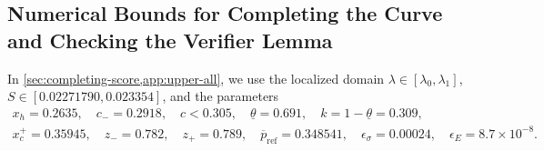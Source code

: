 \documentclass[11pt]{article}
\numberwithin{equation}{section}
\theoremstyle{plain}
\theoremstyle{definition}
\newcommand{\1}{\mathbf{1}}
\begin{document}
\subsection{Numerical Bounds for Completing the Curve and Checking the Verifier Lemma}
\label{app:completion-bounds}

In \cref{sec:completing-score,app:upper-all}, we use the localized domain $\lambda \in [\lambda_0, \lambda_1]$, $S \in [0.02271790, 0.023354]$, and the parameters
\[
  \begin{gathered}
    x_h = 0.2635, \quad c_- = 0.2918, \quad c < 0.305, \quad \underline{\theta} = 0.691, \quad k = 1 - \underline{\theta} = 0.309, \\
    x_c^+ = 0.35945, \quad z_- = 0.782, \quad z_+ = 0.789, \quad \overline{p}_{\mathrm{ref}} = 0.348541, \quad \epsilon_\sigma = 0.00024, \quad \epsilon_E = 8.7 \times 10^{-8}.
  \end{gathered}
\]
\end{document}
